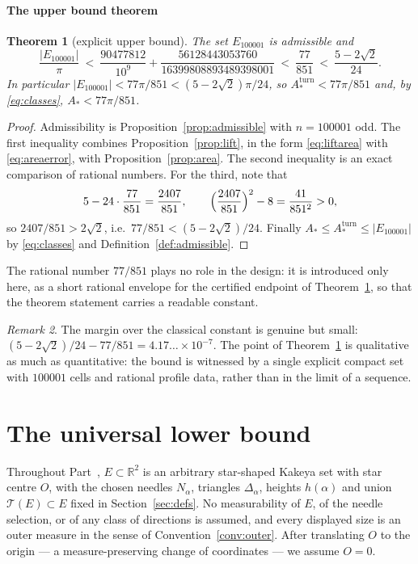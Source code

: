 \documentclass[11pt]{article}
\theoremstyle{plain}
\newtheorem{theorem}{Theorem}[section]
\theoremstyle{definition}
\theoremstyle{remark}
\newtheorem{remark}[theorem]{Remark}
\newcommand{\R}{\mathbb{R}}
\newcommand{\Astar}{A_{*}}
\newcommand{\Aturn}{A_{*}^{\mathrm{turn}}}
\newcommand{\Tri}{\mathcal{T}}
\begin{document}
\subsection{The upper bound theorem}

\begin{theorem}[explicit upper bound]\label{thm:upper}
The set $E_{100001}$ is admissible and
\[
  \frac{|E_{100001}|}{\pi}
  \ <\ \frac{90477812}{10^{9}}+\frac{56128443053760}{16399808893489398001}
  \ <\ \frac{77}{851}
  \ <\ \frac{5-2\sqrt2}{24}.
\]
In particular $|E_{100001}|<77\pi/851<(5-2\sqrt2)\pi/24$, so
$\Aturn<77\pi/851$ and, by \eqref{eq:classes}, $\Astar<77\pi/851$.
\end{theorem}

\begin{proof}
Admissibility is Proposition~\ref{prop:admissible} with $n=100001$ odd. The
first inequality combines Proposition~\ref{prop:lift}, in the form
\eqref{eq:liftarea} with \eqref{eq:areaerror}, with
Proposition~\ref{prop:area}. The second inequality is an exact comparison of
rational numbers. For the third, note that
\[
  5-24\cdot\frac{77}{851}=\frac{2407}{851},
  \qquad
  \Bigl(\frac{2407}{851}\Bigr)^{2}-8=\frac{41}{851^{2}}>0 ,
\]
so $2407/851>2\sqrt2$, i.e.\ $77/851<(5-2\sqrt2)/24$. Finally
$\Astar\le\Aturn\le|E_{100001}|$ by \eqref{eq:classes} and
Definition~\ref{def:admissible}.
\end{proof}

The rational number $77/851$ plays no role in the design: it is introduced only
here, as a short rational envelope for the certified endpoint of
Theorem~\ref{thm:upper}, so that the theorem statement carries a readable
constant.

\begin{remark}
The margin over the classical constant is genuine but small:
$(5-2\sqrt2)/24-77/851=4.17\ldots\times10^{-7}$. The point of
Theorem~\ref{thm:upper} is qualitative as much as quantitative: the bound is
witnessed by a single explicit compact set with $100001$ cells and rational
profile data, rather than in the limit of a sequence.
\end{remark}

\part{The universal lower bound}\label{part:lower}

Throughout Part~\ref{part:lower}, $E\subset\R^{2}$ is an arbitrary star-shaped
Kakeya set with star centre $O$, with the chosen needles $N_{\alpha}$, triangles
$\Delta_{\alpha}$, heights $h(\alpha)$ and union $\Tri(E)\subset E$
fixed in Section~\ref{sec:defs}. No measurability of $E$, of the needle
selection, or of any class of directions is assumed, and every displayed size is
an outer measure in the sense of Convention~\ref{conv:outer}. After translating
$O$ to the origin --- a measure-preserving change of coordinates --- we assume
$O=0$.
\end{document}
